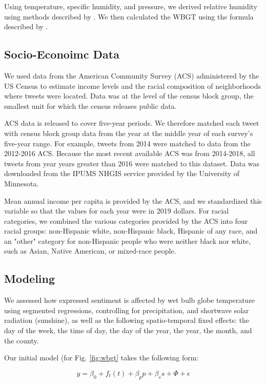 \documentclass[fleqn,10pt]{wlscirep}
\begin{document}
Using temperature, specific humidity, and pressure, we derived relative humidity using methods described by  \cite{bolton_computation_1980}.  We then calculated the WBGT using the formula described by \cite{heo2019comparison}.

\subsection*{Socio-Econoimc Data}
We used data from the American Community Survey (ACS) administered by the US Census to estimate income levels and the racial composition of neighborhoods where tweets were located.  Data was at the level of the census block group, the smallest unit for which the census releases public data.

ACS data is released to cover five-year periods.  We therefore matched each tweet with census block group data from the year at the middle year of each survey's five-year range.  For example, tweets from 2014 were matched to data from the 2012-2016 ACS.  Because the most recent available ACS was from 2014-2018, all tweets from year years greater than 2016 were matched to this dataset.  Data was downloaded from the IPUMS NHGIS service provided by the University of Minnesota.

Mean annual income per capita is provided by the ACS, and we standardized this variable so that the values for each year were in 2019 dollars.  For racial categories, we combined the various categories provided by the ACS into four racial groups: non-Hispanic white, non-Hispanic black, Hispanic of any race, and an "other" category for non-Hispanic people who were neither black nor white, such as Asian, Native American, or mixed-race people.

\subsection*{Modeling}
We assessed how expressed sentiment is affected by wet bulb globe temperature using segmented regressions, controlling for precipitation, and shortwave solar radiation (sunshine), as well as the following spatio-temporal fixed effects: the day of the week, the time of day, the day of the year, the year, the month, and the county.  

Our initial model (for Fig. \ref{fig:wbgt} takes the following form:

\begin{equation}
    y = \beta_0 + f_t(t) + \beta_p p + \beta_s s + \Phi + \epsilon
\end{equation}
\end{document}
